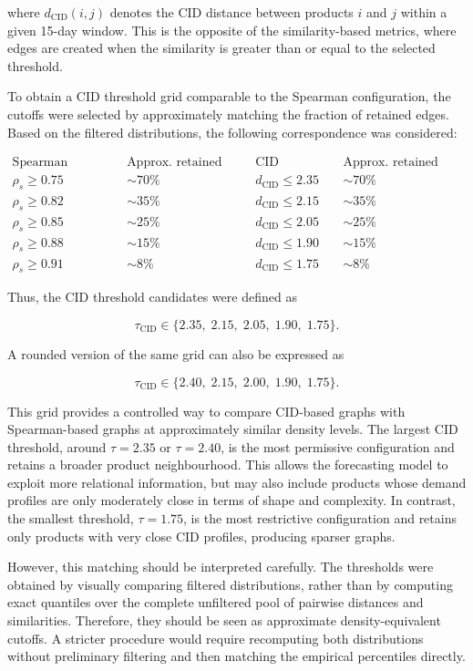 where $d_{\text{CID}}(i,j)$ denotes the CID distance between products $i$ and $j$ within a given 15-day window. This is the opposite of the similarity-based metrics, where edges are created when the similarity is greater than or equal to the selected threshold.

To obtain a CID threshold grid comparable to the Spearman configuration, the cutoffs were selected by approximately matching the fraction of retained edges. Based on the filtered distributions, the following correspondence was considered:

\[
\begin{array}{c|c|c|c}
\text{Spearman threshold} & \text{Approx. retained edges} & \text{CID threshold} & \text{Approx. retained edges} \\
\hline
\rho_s \geq 0.75 & \sim 70\% & d_{\text{CID}} \leq 2.35 & \sim 70\% \\
\rho_s \geq 0.82 & \sim 35\% & d_{\text{CID}} \leq 2.15 & \sim 35\% \\
\rho_s \geq 0.85 & \sim 25\% & d_{\text{CID}} \leq 2.05 & \sim 25\% \\
\rho_s \geq 0.88 & \sim 15\% & d_{\text{CID}} \leq 1.90 & \sim 15\% \\
\rho_s \geq 0.91 & \sim 8\%  & d_{\text{CID}} \leq 1.75 & \sim 8\%
\end{array}
\]

Thus, the CID threshold candidates were defined as

\[
\tau_{\text{CID}} \in \{2.35,\; 2.15,\; 2.05,\; 1.90,\; 1.75\}.
\]

A rounded version of the same grid can also be expressed as

\[
\tau_{\text{CID}} \in \{2.40,\; 2.15,\; 2.00,\; 1.90,\; 1.75\}.
\]

This grid provides a controlled way to compare CID-based graphs with Spearman-based graphs at approximately similar density levels. The largest CID threshold, around $\tau = 2.35$ or $\tau = 2.40$, is the most permissive configuration and retains a broader product neighbourhood. This allows the forecasting model to exploit more relational information, but may also include products whose demand profiles are only moderately close in terms of shape and complexity. In contrast, the smallest threshold, $\tau = 1.75$, is the most restrictive configuration and retains only products with very close CID profiles, producing sparser graphs.

However, this matching should be interpreted carefully. The thresholds were obtained by visually comparing filtered distributions, rather than by computing exact quantiles over the complete unfiltered pool of pairwise distances and similarities. Therefore, they should be seen as approximate density-equivalent cutoffs. A stricter procedure would require recomputing both distributions without preliminary filtering and then matching the empirical percentiles directly.

